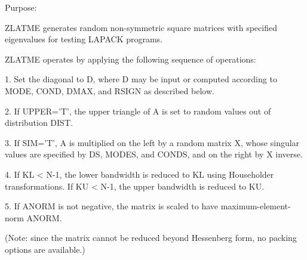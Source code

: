 \begin{DoxyParagraph}{Purpose\+: }
\begin{DoxyVerb}    ZLATME generates random non-symmetric square matrices with
    specified eigenvalues for testing LAPACK programs.

    ZLATME operates by applying the following sequence of
    operations:

    1. Set the diagonal to D, where D may be input or
         computed according to MODE, COND, DMAX, and RSIGN
         as described below.

    2. If UPPER='T', the upper triangle of A is set to random values
         out of distribution DIST.

    3. If SIM='T', A is multiplied on the left by a random matrix
         X, whose singular values are specified by DS, MODES, and
         CONDS, and on the right by X inverse.

    4. If KL < N-1, the lower bandwidth is reduced to KL using
         Householder transformations.  If KU < N-1, the upper
         bandwidth is reduced to KU.

    5. If ANORM is not negative, the matrix is scaled to have
         maximum-element-norm ANORM.

    (Note: since the matrix cannot be reduced beyond Hessenberg form,
     no packing options are available.)\end{DoxyVerb}
 
\end{DoxyParagraph}

